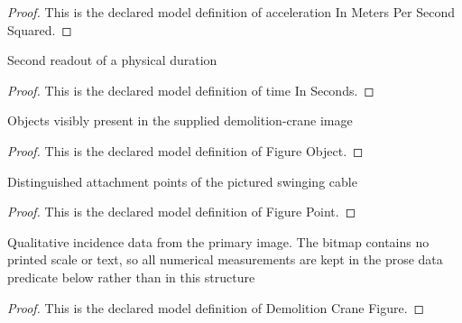 \begin{proof}
  This is the declared model definition of acceleration In Meters Per Second Squared.
\end{proof}
\begin{definition}
  \label{def:physics:phyx-mini-0284:phyxminiproblems-problemphyxmini0284-timeinseconds}
  Second readout of a physical duration
\end{definition}
\begin{proof}
  This is the declared model definition of time In Seconds.
\end{proof}
\begin{definition}
  \label{def:physics:phyx-mini-0284:phyxminiproblems-problemphyxmini0284-figureobject}
  Objects visibly present in the supplied demolition-crane image
\end{definition}
\begin{proof}
  This is the declared model definition of Figure Object.
\end{proof}
\begin{definition}
  \label{def:physics:phyx-mini-0284:phyxminiproblems-problemphyxmini0284-figurepoint}
  Distinguished attachment points of the pictured swinging cable
\end{definition}
\begin{proof}
  This is the declared model definition of Figure Point.
\end{proof}
\begin{definition}
  \label{def:physics:phyx-mini-0284:phyxminiproblems-problemphyxmini0284-demolitioncranefigure}
  Qualitative incidence data from the primary image. The bitmap contains no printed scale or text, so all numerical measurements are kept in the prose data predicate below rather than in this structure
\end{definition}
\begin{proof}
  This is the declared model definition of Demolition Crane Figure.
\end{proof}
